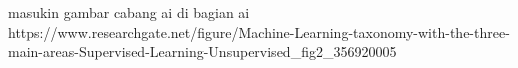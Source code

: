 masukin gambar cabang ai di bagian ai https://www.researchgate.net/figure/Machine-Learning-taxonomy-with-the-three-main-areas-Supervised-Learning-Unsupervised_fig2_356920005
